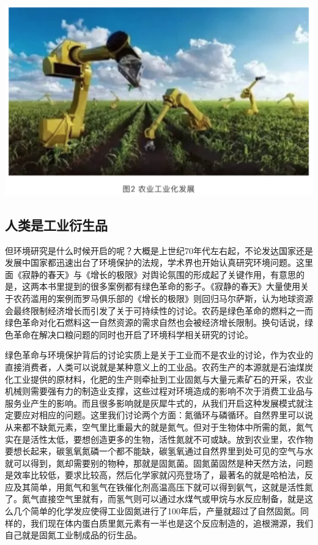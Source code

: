 \documentclass[]{book}
\begin{document}
\includegraphics[width=6.67in]{images/renkou2}

\hypertarget{ux4ebaux7c7bux662fux5de5ux4e1aux884dux751fux54c1}{%
\subsection{人类是工业衍生品}\label{ux4ebaux7c7bux662fux5de5ux4e1aux884dux751fux54c1}}

但环境研究是什么时候开启的呢？大概是上世纪70年代左右起，不论发达国家还是发展中国家都迅速出台了环境保护的法规，学术界也开始认真研究环境问题。这里面《寂静的春天》与《增长的极限》对舆论氛围的形成起了关键作用，有意思的是，这两本书里提到的很多案例都有绿色革命的影子。《寂静的春天》大量使用关于农药滥用的案例而罗马俱乐部的《增长的极限》则回归马尔萨斯，认为地球资源会最终限制经济增长而引发了关于可持续性的讨论。农药是绿色革命的燃料之一而绿色革命对化石燃料这一自然资源的需求自然也会被经济增长限制。换句话说，绿色革命在解决口粮问题的同时也开启了环境科学相关研究的讨论。

绿色革命与环境保护背后的讨论实质上是关于工业而不是农业的讨论，作为农业的直接消费者，人类可以说就是某种意义上的工业品。农药生产的本源就是石油煤炭化工业提供的原材料，化肥的生产则牵扯到工业固氮与大量元素矿石的开采，农业机械则需要强有力的制造业支撑，这些过程对环境造成的影响不次于消费工业品与服务业产生的影响。而且很多影响就是灰犀牛式的，从我们开启这种发展模式就注定要应对相应的问题。这里我们讨论两个方面：氮循环与磷循环。自然界里可以说从来都不缺氮元素，空气里比重最大的就是氮气。但对于生物体中所需的氮，氮气实在是活性太低，要想创造更多的生物，活性氮就不可或缺。放到农业里，农作物要想长起来，碳氢氧氮磷一个都不能缺，碳氢氧通过自然界里到处可见的空气与水就可以得到，氮却需要别的物种，那就是固氮菌。固氮菌固然是种天然方法，问题是效率比较低，要求比较高，然后化学家就闪亮登场了，最著名的就是哈柏法，反应及其简单，用氮气和氢气在铁催化剂高温高压下就可以得到氨气，这就是活性氮了。氮气直接空气里就有，而氢气则可以通过水煤气或甲烷与水反应制备，就是这么几个简单的化学发应使得工业固氮进行了100年后，产量就超过了自然固氮。同样的，我们现在体内蛋白质里氮元素有一半也是这个反应制造的，追根溯源，我们自己就是固氮工业制成品的衍生品。
\end{document}
